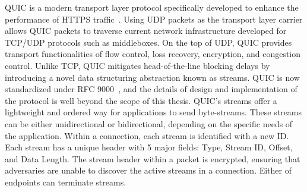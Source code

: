 
QUIC is a modern transport layer protocol specifically developed to enhance the performance of HTTPS traffic~\cite{langley2017quic}.
Using UDP packets as the transport layer carrier allows QUIC packets to traverse current network infrastructure developed for TCP/UDP protocols such as middleboxes.
On the top of UDP, QUIC provides transport functionalities of flow control, loss recovery, encryption, and congestion control.
Unlike TCP, QUIC mitigates head-of-the-line blocking delays by introducing a novel data structuring abstraction known as streams. 
QUIC is now standardized under RFC 9000~\cite{rfc9000}, and the details of design and implementation of the protocol is well beyond the scope of this thesis.
QUIC's streams offer a lightweight and ordered way for applications to send byte-streams.
These streams can be either unidirectional or bidirectional, depending on the specific needs of the application.
Within a connection, each stream is identified with a new ID.
Each stream has a unique header with 5 major fields: Type, Stream ID, Offset, and Data Length.
The stream header within a packet is encrypted, ensuring that adversaries are unable to discover the active streams in a connection.
Either of endpoints can terminate streams.



